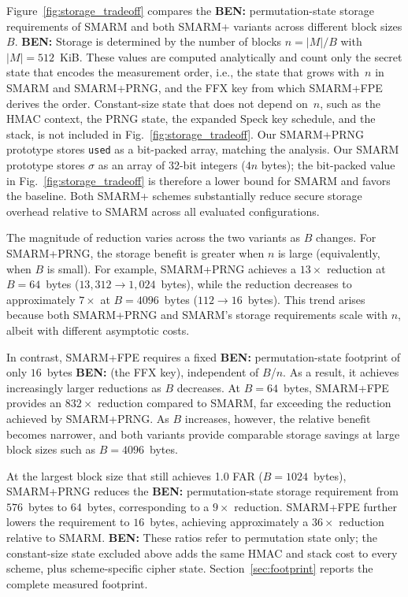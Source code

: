 \documentclass{ieeeaccess}
\DeclareRobustCommand{\ben}[1]{{\color{BENcolor}\textbf{BEN:} #1}}
\newcommand{\rtsmarm}{SMARM+\xspace}
\newcommand{\rtsmarmone}{SMARM+PRNG\xspace}
\newcommand{\rtsmarmtwo}{SMARM+FPE\xspace}
\begin{document}
Figure~\ref{fig:storage_tradeoff} compares the \ben{permutation-state} storage requirements of SMARM and both \rtsmarm variants across different block sizes $B$.
\ben{Storage is determined by the number of blocks $n = |M|/B$ with $|M| = 512$~KiB.
These values are computed analytically and count only the secret state that encodes the measurement order, i.e., the state that grows with~$n$ in SMARM and \rtsmarmone, and the FFX key from which \rtsmarmtwo derives the order.
Constant-size state that does not depend on~$n$, such as the HMAC context, the PRNG state, the expanded Speck key schedule, and the stack, is not included in Fig.~\ref{fig:storage_tradeoff}.
Our \rtsmarmone prototype stores \texttt{used} as a bit-packed array, matching the analysis.
Our SMARM prototype stores $\sigma$ as an array of 32-bit integers ($4n$ bytes); the bit-packed value in Fig.~\ref{fig:storage_tradeoff} is therefore a lower bound for SMARM and favors the baseline.}
Both \rtsmarm schemes substantially reduce secure storage overhead relative to SMARM across all evaluated configurations.

The magnitude of reduction varies across the two variants as $B$ changes.
For \rtsmarmone, the storage benefit is greater when $n$ is large (equivalently, when $B$ is small).
For example, \rtsmarmone achieves a $13\times$ reduction at $B = 64$~bytes ($13{,}312 \rightarrow 1{,}024$~bytes), while the reduction decreases to approximately $7\times$ at $B = 4096$~bytes ($112 \rightarrow 16$~bytes).
This trend arises because both \rtsmarmone and SMARM's storage requirements scale with $n$, albeit with different asymptotic costs.

In contrast, \rtsmarmtwo requires a fixed \ben{permutation-state} footprint of only $16$~bytes \ben{(the FFX key)}, independent of $B$/$n$.
As a result, it achieves increasingly larger reductions as $B$ decreases.
At $B = 64$~bytes, \rtsmarmtwo provides an $832\times$ reduction compared to SMARM, far exceeding the reduction achieved by \rtsmarmone.
As $B$ increases, however, the relative benefit becomes narrower, and both variants provide comparable storage savings at large block sizes such as $B = 4096$~bytes.

At the largest block size that still achieves 1.0 FAR ($B = 1024$~bytes), \rtsmarmone reduces the \ben{permutation-state} storage requirement from $576$~bytes to $64$~bytes, corresponding to a $9\times$ reduction.
\rtsmarmtwo further lowers the requirement to $16$~bytes, achieving approximately a $36\times$ reduction relative to SMARM.
\ben{These ratios refer to permutation state only; the constant-size state excluded above adds the same HMAC and stack cost to every scheme, plus scheme-specific cipher state.
Section~\ref{sec:footprint} reports the complete measured footprint.}
\end{document}
